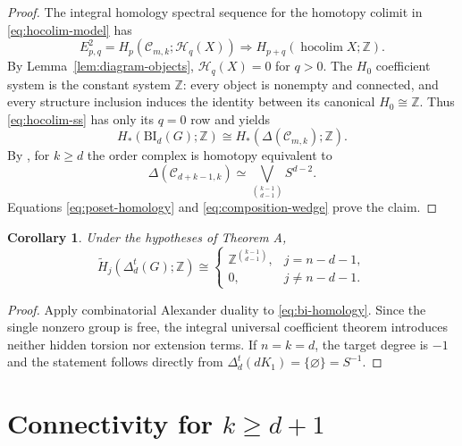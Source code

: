 \documentclass[11pt]{article}
\newtheorem{corollary}[theorem]{Corollary}
\theoremstyle{remark}
\numberwithin{equation}{section}
\begin{document}
\begin{proof}
The integral homology spectral sequence for the homotopy colimit in
\eqref{eq:hocolim-model} has
\begin{equation}
E^2_{p,q}
=H_p(\mathcal C_{m,k};\mathcal H_q(X))
\Longrightarrow
H_{p+q}(\operatorname*{hocolim}X;\mathbb Z).
\label{eq:hocolim-ss}
\end{equation}
By Lemma~\ref{lem:diagram-objects}, $\mathcal H_q(X)=0$ for $q>0$. The $H_0$
coefficient system is the constant system $\mathbb Z$: every object is
nonempty and connected, and every structure inclusion induces the identity
between its canonical $H_0\cong\mathbb Z$. Thus \eqref{eq:hocolim-ss} has only
its $q=0$ row and yields
\begin{equation}
H_*(\mathrm{BI}_d(G);\mathbb Z)
\cong H_*(\Delta(\mathcal C_{m,k});\mathbb Z).
\label{eq:poset-homology}
\end{equation}
By \cite[Proposition 12]{ref2}, for $k\geq d$ the order complex is homotopy
equivalent to
\begin{equation}
\Delta(\mathcal C_{d+k-1,k})
\simeq
\bigvee_{\binom{k-1}{d-1}}S^{d-2}.
\label{eq:composition-wedge}
\end{equation}
Equations \eqref{eq:poset-homology} and \eqref{eq:composition-wedge} prove the
claim.
\end{proof}

\begin{corollary}\label{cor:total-cut-homology}
Under the hypotheses of Theorem A,
\begin{equation}
\widetilde H_j(\Delta_d^t(G);\mathbb Z)
\cong
\begin{cases}
\mathbb Z^{\binom{k-1}{d-1}},&j=n-d-1,\\
0,&j\neq n-d-1.
\end{cases}
\label{eq:total-cut-homology}
\end{equation}
\end{corollary}

\begin{proof}
Apply combinatorial Alexander duality to \eqref{eq:bi-homology}. Since the
single nonzero group is free, the integral universal coefficient theorem
introduces neither hidden torsion nor extension terms. If $n=k=d$, the target
degree is $-1$ and the statement follows directly from
$\Delta_d^t(dK_1)=\{\varnothing\}=S^{-1}$.
\end{proof}

\section{Connectivity for \texorpdfstring{$k\geq d+1$}{k >= d+1}}\label{sec:connectivity}
\end{document}
